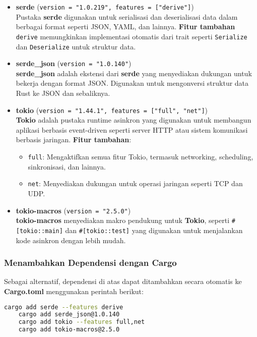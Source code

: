 \begin{itemize}
	\item \textbf{serde} (\texttt{version = "1.0.219", features = ["derive"]}) \\
	Pustaka \textbf{serde} digunakan untuk serialisasi dan deserialisasi data dalam berbagai format seperti JSON, YAML, dan lainnya.  
	\textbf{Fitur tambahan} \texttt{derive} memungkinkan implementasi otomatis dari trait seperti \texttt{Serialize} dan \texttt{Deserialize} untuk struktur data.
	
	\item \textbf{serde\_json} (\texttt{version = "1.0.140"}) \\
	\textbf{serde\_json} adalah ekstensi dari \textbf{serde} yang menyediakan dukungan untuk bekerja dengan format JSON. Digunakan untuk mengonversi struktur data Rust ke JSON dan sebaliknya.
	
	\item \textbf{tokio} (\texttt{version = "1.44.1", features = ["full", "net"]}) \\
	\textbf{Tokio} adalah pustaka runtime asinkron yang digunakan untuk membangun aplikasi berbasis event-driven seperti server HTTP atau sistem komunikasi berbasis jaringan.  
	\textbf{Fitur tambahan}:
	\begin{itemize}
		\item \texttt{full}: Mengaktifkan semua fitur Tokio, termasuk networking, scheduling, sinkronisasi, dan lainnya.
		\item \texttt{net}: Menyediakan dukungan untuk operasi jaringan seperti TCP dan UDP.
	\end{itemize}
	
	\item \textbf{tokio-macros} (\texttt{version = "2.5.0"}) \\
	\textbf{tokio-macros} menyediakan makro pendukung untuk \textbf{Tokio}, seperti \texttt{\#[tokio::main]} dan \texttt{\#[tokio::test]} yang digunakan untuk menjalankan kode asinkron dengan lebih mudah.
\end{itemize}

\subsubsection{Menambahkan Dependensi dengan Cargo}
Sebagai alternatif, dependensi di atas dapat ditambahkan secara otomatis ke \textbf{Cargo.toml} menggunakan perintah berikut:

\begin{lstlisting}[language=bash]
	cargo add serde --features derive
	cargo add serde_json@1.0.140
	cargo add tokio --features full,net
	cargo add tokio-macros@2.5.0
\end{lstlisting}

